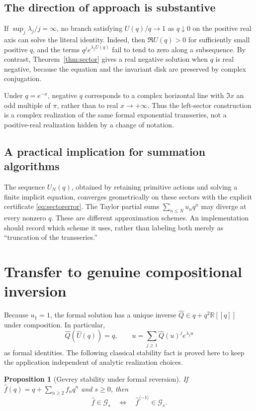 \documentclass[11pt,a4paper]{article}
\numberwithin{equation}{section}
\newtheorem{proposition}[theorem]{Proposition}
\theoremstyle{definition}
\theoremstyle{remark}
\newcommand{\R}{\mathbb R}
\newcommand{\Gev}{\mathcal G}
\newcommand{\Uhat}{\widehat U}
\newcommand{\Qhat}{\widehat Q}
\begin{document}
\subsection{The direction of approach is substantive}
If $\sup_j\lambda_j/j=\infty$, no branch satisfying $U(q)/q\to1$ as
$q\downarrow0$ on the positive real axis can solve the literal identity.
Indeed, then $\Re U(q)>0$ for sufficiently small positive $q$, and the
terms $q^je^{\lambda_jU(q)}$ fail to tend to zero along a subsequence.
By contrast, Theorem~\ref{thm:sector} gives a real negative solution when
$q$ is real negative, because the equation and the invariant disk are
preserved by complex conjugation.

Under $q=e^{-x}$, negative $q$ corresponds to a complex horizontal line
with $\Im x$ an odd multiple of $\pi$, rather than to real $x\to+\infty$.
Thus the left-sector construction is a complex realization of the same
formal exponential transseries, not a positive-real realization hidden
by a change of notation.

\subsection{A practical implication for summation algorithms}
The sequence $U_N(q)$, obtained by retaining primitive actions and solving
a finite implicit equation, converges geometrically on these sectors with
the explicit certificate \eqref{eq:sectorerror}.  The Taylor partial sums
$\sum_{n\le N}u_nq^n$ may diverge at every nonzero $q$.  These are different
approximation schemes.  An implementation should record which scheme it
uses, rather than labeling both merely as ``truncation of the transseries.''

\section{Transfer to genuine compositional inversion}
\label{sec:inverse}

Because $u_1=1$, the formal solution has a unique inverse
$\Qhat\in q+q^2\R[[q]]$ under composition.  In particular,
\begin{equation}
 \Qhat(\Uhat(q))=q,
 \qquad
 u=\sum_{j\ge1}\Qhat(u)^j e^{\lambda_j u}
 \label{eq:inverseidentity}
\end{equation}
as formal identities.  The following classical stability fact is proved
here to keep the application independent of analytic realization choices.

\begin{proposition}[Gevrey stability under formal reversion]
\label{prop:reversion}
If $\widehat f(q)=q+\sum_{n\ge2}f_nq^n$ and $s\ge0$, then
\[
 \widehat f\in\Gev_s
 \quad\Longleftrightarrow\quad
 \widehat f^{\langle-1\rangle}\in\Gev_s.
\]
\end{proposition}
\end{document}
